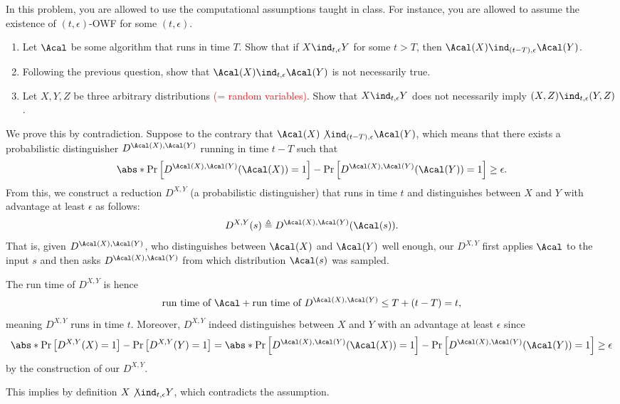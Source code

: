 \begin{problem}\label{p1}
    \leavevmode\par
    In this problem, you are allowed to use the computational assumptions taught in class. For instance, you are allowed to assume the existence of $(t, \epsilon)$-OWF for some $(t, \epsilon)$.
    \begin{enumerate}[label=(\alph*)]
        \item Let $\Acal$ be some algorithm that runs in time $T$. Show that if $X\ind_{t,\epsilon} Y$  for some $t\gt T$, then $\Acal(X)\ind_{(t-T),\epsilon} \Acal(Y)$.
        \item Following the previous question, show that $\Acal(X) \ind_{t,\epsilon} \Acal(Y)$ is not necessarily true.
        \item Let $X, Y, Z$ be three arbitrary distributions \textcolor{red}{(= random variables)}. Show that $X\ind_{t,\epsilon} Y$ does not necessarily imply $(X,Z)\ind_{t,\epsilon} (Y,Z)$.
    \end{enumerate}
\end{problem}

\begin{answer}[a]
    We prove this by contradiction. Suppose to the contrary that $\Acal(X)\not\ind_{(t-T),\epsilon} \Acal(Y)$, which means that there exists a probabilistic distinguisher $D^{\Acal(X),\Acal(Y)}$ running in time $t-T$ such that 
    \[
        \abs*{\Pr\left[D^{\Acal(X),\Acal(Y)}(\Acal(X))=1\right]-\Pr\left[D^{\Acal(X),\Acal(Y)}(\Acal(Y))=1\right]} \ge \epsilon.
    \]
    From this, we construct a reduction $D^{X,Y}$ (a probabilistic distinguisher) that runs in time $t$ and distinguishes between $X$ and $Y$ with advantage at least $\epsilon$ as follows:
    \[
        D^{X,Y}(s) \triangleq D^{\Acal(X),\Acal(Y)}(\Acal(s)).
    \]
    That is, given $D^{\Acal(X),\Acal(Y)}$, who distinguishes between $\Acal(X)$ and $\Acal(Y)$ well enough, our $D^{X,Y}$ first applies $\Acal$ to the input $s$ and then asks $D^{\Acal(X),\Acal(Y)}$ from which distribution $\Acal(s)$ was sampled.

    The run time of $D^{X,Y}$ is hence 
    \[
        \textrm{run time of } \Acal + \textrm{run time of }D^{\Acal(X),\Acal(Y)} \le T+(t-T)=t, 
    \] meaning $D^{X,Y}$ runs in time $t$. Moreover, $D^{X,Y}$ indeed distinguishes between $X$ and $Y$ with an advantage at least $\epsilon$ since
    \[
        \abs*{\Pr\left[D^{X,Y}(X)=1\right]-\Pr\left[D^{X,Y}(Y)=1\right]} 
        =\abs*{\Pr\left[D^{\Acal(X),\Acal(Y)}(\Acal(X))=1\right]-\Pr\left[D^{\Acal(X),\Acal(Y)}(\Acal(Y))=1\right]} 
        \ge \epsilon
    \]
    by the construction of our $D^{X,Y}$.

    This implies by definition $X\not\ind_{t,\epsilon} Y$, which contradicts the assumption.
\end{answer}



